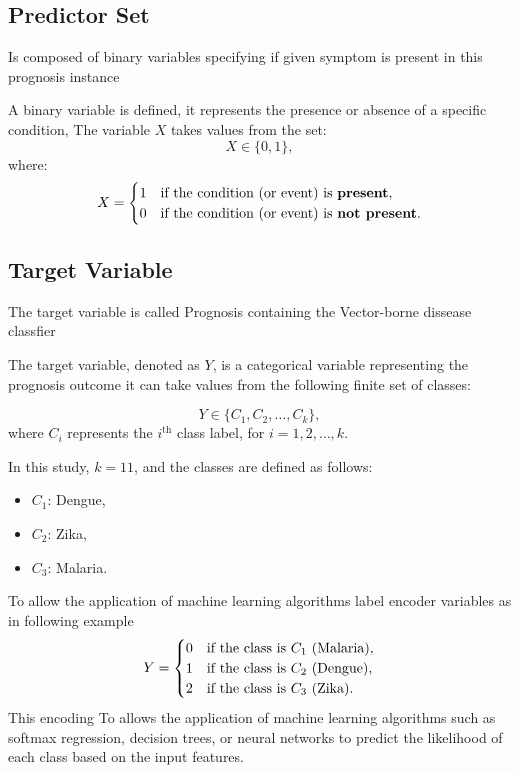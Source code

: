 \documentclass{article}
\begin{document}
\subsection{Predictor Set}
Is composed of binary variables specifying if given symptom is present 
in this prognosis instance

A binary variable is defined, it represents the presence or absence of a specific condition, The variable \( X \) takes values from the set:
\[
X \in \{0, 1\},
\]
where:
\[
X =
\begin{cases}
1 & \text{if the condition (or event) is \textbf{present}}, \\
0 & \text{if the condition (or event) is \textbf{not present}}.
\end{cases}
\]

\subsection{Target Variable}
The target variable is called Prognosis containing the Vector-borne dissease classfier

The target variable, denoted as \( Y \), is a categorical variable representing the prognosis outcome it can take values from the following finite set of classes:

\[
Y \in \{ C_1, C_2, \dots, C_k \},
\]
where \( C_i \) represents the \( i^{\text{th}} \) class label, for \( i = 1, 2, \dots, k \).

In this study, \( k = 11 \), and the classes are defined as follows:
\begin{itemize}
    \item \( C_1 \): Dengue,
    \item \( C_2 \): Zika,
    \item \( C_3 \): Malaria.
\end{itemize}
To allow the application of machine learning algorithms label encoder variables as in following example
\[
Y = 
\begin{cases} 
0 & \text{if the class is \( C_1 \) (Malaria)}, \\
1 & \text{if the class is \( C_2 \) (Dengue)}, \\
2 & \text{if the class is \( C_3 \) (Zika)}.
\end{cases}
\]
This encoding To allows the application of machine learning algorithms such as softmax regression, decision trees, or neural networks to predict the likelihood of each class based on the input features.
\end{document}
